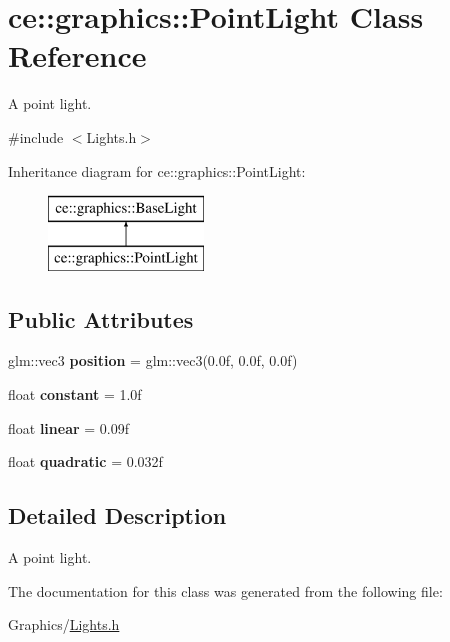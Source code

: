 \hypertarget{classce_1_1graphics_1_1_point_light}{}\section{ce\+:\+:graphics\+:\+:Point\+Light Class Reference}
\label{classce_1_1graphics_1_1_point_light}


A point light.  




{\ttfamily \#include $<$Lights.\+h$>$}

Inheritance diagram for ce\+:\+:graphics\+:\+:Point\+Light\+:\begin{figure}[H]
\begin{center}
\leavevmode
\includegraphics[height=2.000000cm]{classce_1_1graphics_1_1_point_light}
\end{center}
\end{figure}
\subsection*{Public Attributes}
\begin{DoxyCompactItemize}
\item 
\mbox{\label{classce_1_1graphics_1_1_point_light_a243f8f1019644d4a983a76bee93dd0e5}} 
glm\+::vec3 {\bfseries position} = glm\+::vec3(0.\+0f, 0.\+0f, 0.\+0f)
\item 
\mbox{\label{classce_1_1graphics_1_1_point_light_aeaa6b5a0295a24d5ee38857bc27fe971}} 
float {\bfseries constant} = 1.\+0f
\item 
\mbox{\label{classce_1_1graphics_1_1_point_light_a17a135df574a30bc43e0ca56f46361ca}} 
float {\bfseries linear} = 0.\+09f
\item 
\mbox{\label{classce_1_1graphics_1_1_point_light_a4a5db9aa2d038c7392d386614c92ac72}} 
float {\bfseries quadratic} = 0.\+032f
\end{DoxyCompactItemize}


\subsection{Detailed Description}
A point light. 

The documentation for this class was generated from the following file\+:\begin{DoxyCompactItemize}
\item 
Graphics/\hyperlink{_lights_8h}{Lights.\+h}\end{DoxyCompactItemize}

